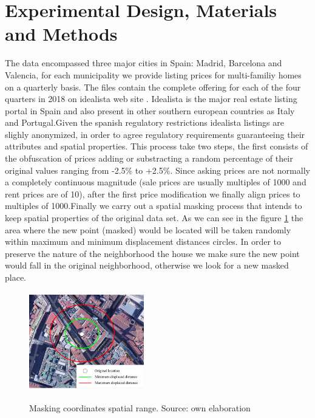 \documentclass[times,final]{elsarticle}
\begin{document}
\section*{Experimental Design, Materials and Methods}

The data encompassed three major cities in Spain: Madrid, Barcelona and Valencia, for each municipality we provide listing prices for multi-familiy homes on a quarterly basis. The files contain the complete offering for each of the four quarters in 2018 on idealista web site \cite{idealista}. Idealista is the major real estate listing portal in Spain and also present in other southern european countries as Italy and Portugal.Given the spanish regulatory restrictions idealista listings are slighly anonymized, in order to agree regulatory requirements guaranteeing their attributes and spatial properties. This process take two steps, the first consists of the obfuscation of prices adding or substracting a random percentage of their original values ranging from -2.5\% to +2.5\%. Since asking prices are not normally a completely continuous magnitude (sale prices are usually multiples of 1000 and rent prices are of 10), after the first price modification we finally align prices to multiples of 1000.Finally we carry out a spatial masking process that intends to keep spatial properties of the original data set. As we can see in the figure \ref{fig:points-moved-image} the area where the new point (masked) would be located will be taken randomly within maximum and minimum displacement distances circles. In order to preserve the nature of the neighborhood the house we make sure the new point would fall in the original neighborhood, otherwise we look for a new masked place.

\begin{figure}[!ht]
  \caption{Masking coordinates spatial range. Source: own elaboration}
  \centering
  \includegraphics[width=5cm, height=4.3cm]{figures/points-moved-image}
  \label{fig:points-moved-image}
\end{figure}
\end{document}

